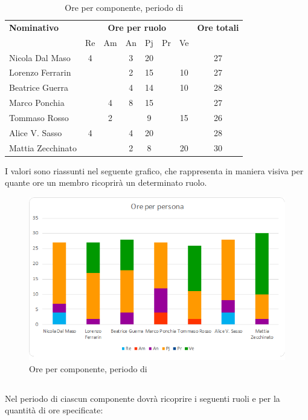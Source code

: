 \begin{table}[H]
	\centering
	\begin{tabular}{|l|c|c|c|c|c|c|c|}
		\hline
		\textbf{Nominativo} & 
		\multicolumn{6}{c|}{\textbf{Ore per ruolo}} & 
		\textbf{Ore totali} \\
		& Re & Am & An & Pj & Pr & Ve & \\
		\hline
		Nicola Dal Maso &4 & &3 &20 & & & 27 \\
		Lorenzo Ferrarin & & &2 &15 & &10 & 27 \\
		Beatrice Guerra & & &4 &14 & &10 & 28 \\
		Marco Ponchia & &4 &8 &15 & & & 27 \\
		Tommaso Rosso & &2 & &9 & &15 & 26 \\
		Alice V. Sasso &4 & &4 &20 & & & 28 \\
		Mattia Zecchinato & & &2 &8 & &20 & 30 \\
		\hline
	\end{tabular}
	\caption{Ore per componente, periodo di \PA{}}
\end{table}
I valori sono riassunti nel seguente grafico, che rappresenta in maniera visiva per quante ore un membro ricoprirà un determinato ruolo.
\begin{figure}[H]
	\centering
	\includegraphics[width=14cm]{img_suddlavoro/PA.png}
	\caption{Ore per componente, periodo di \PA{}}
\end{figure}

\subsection{\PD}
Nel periodo di \PD{} ciascun componente dovrà ricoprire i seguenti ruoli e per la quantità di ore specificate:


